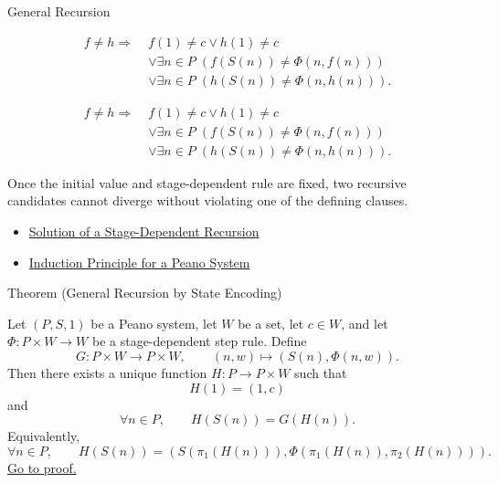 \begin{topicbox}{General Recursion}
\begin{remark*}
\[
\begin{aligned}
f\neq h
\Longrightarrow\;&
f(1)\neq c\lor h(1)\neq c\\
&\lor \exists n\in P\;(f(S(n))\neq \Phi(n,f(n)))\\
&\lor \exists n\in P\;(h(S(n))\neq \Phi(n,h(n))).
\end{aligned}
\]
\end{remark*}

\begin{remark*}
\[
\begin{aligned}
f\neq h
\Longrightarrow\;&
f(1)\neq c\lor h(1)\neq c\\
&\lor \exists n\in P\;(f(S(n))\neq \Phi(n,f(n)))\\
&\lor \exists n\in P\;(h(S(n))\neq \Phi(n,h(n))).
\end{aligned}
\]
\end{remark*}

\begin{remark*}[Interpretation]
Once the initial value and stage-dependent rule are fixed, two recursive
candidates cannot diverge without violating one of the defining clauses.
\end{remark*}

\begin{dependencies}
\begin{itemize}
  \item \hyperref[def:general-recursive-function]{Solution of a Stage-Dependent Recursion}
  \item \hyperref[thm:induction-principle-for-peano-system]{Induction Principle for a Peano System}
\end{itemize}
\end{dependencies}

\begin{theorembox}{Theorem (General Recursion by State Encoding)}
\begin{theorem}
\label{thm:general-recursion-by-state-encoding}
Let $(P,S,1)$ be a Peano system, let $W$ be a set, let $c\in W$, and let
$\Phi\colon P\times W\to W$ be a stage-dependent step rule. Define
\[
G\colon P\times W\to P\times W,
\qquad
(n,w)\mapsto (S(n),\Phi(n,w)).
\]
Then there exists a unique function $H\colon P\to P\times W$ such that
\[
H(1)=(1,c)
\]
and
\[
\forall n\in P,\qquad
H(S(n))=G(H(n)).
\]
Equivalently,
\[
\forall n\in P,\qquad
H(S(n))=
\left(S(\pi_1(H(n))),\Phi(\pi_1(H(n)),\pi_2(H(n)))\right).
\]
\hyperref[prf:general-recursion-by-state-encoding]{Go to proof.}
\end{theorem}
\end{theorembox}


\end{topicbox}
